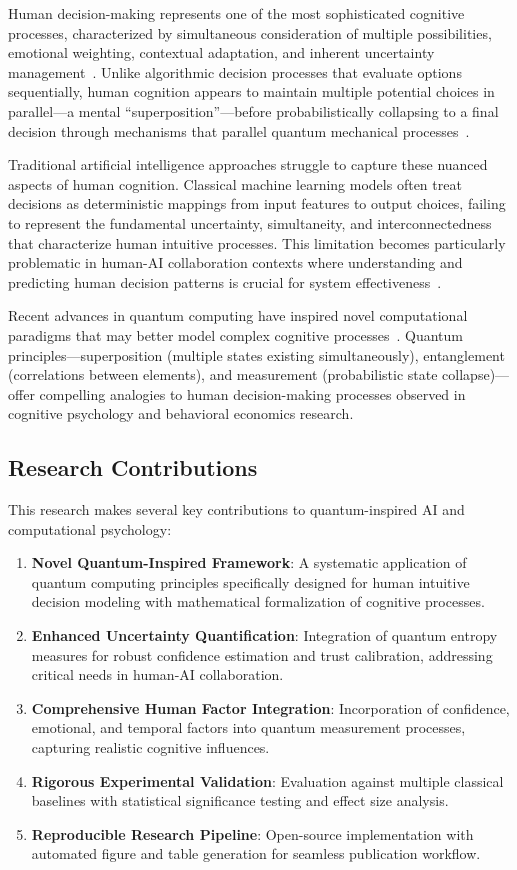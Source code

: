 \documentclass[conference]{IEEEtran}
\begin{document}
Human decision-making represents one of the most sophisticated cognitive processes, characterized by simultaneous consideration of multiple possibilities, emotional weighting, contextual adaptation, and inherent uncertainty management~\cite{kahneman2011thinking}. Unlike algorithmic decision processes that evaluate options sequentially, human cognition appears to maintain multiple potential choices in parallel—a mental ``superposition''—before probabilistically collapsing to a final decision through mechanisms that parallel quantum mechanical processes~\cite{busemeyer2012quantum}.

Traditional artificial intelligence approaches struggle to capture these nuanced aspects of human cognition. Classical machine learning models often treat decisions as deterministic mappings from input features to output choices, failing to represent the fundamental uncertainty, simultaneity, and interconnectedness that characterize human intuitive processes. This limitation becomes particularly problematic in human-AI collaboration contexts where understanding and predicting human decision patterns is crucial for system effectiveness~\cite{russell2019human}.

Recent advances in quantum computing have inspired novel computational paradigms that may better model complex cognitive processes~\cite{biamonte2017quantum}. Quantum principles—superposition (multiple states existing simultaneously), entanglement (correlations between elements), and measurement (probabilistic state collapse)—offer compelling analogies to human decision-making processes observed in cognitive psychology and behavioral economics research.

\subsection{Research Contributions}

This research makes several key contributions to quantum-inspired AI and computational psychology:
\begin{enumerate}
\item \textbf{Novel Quantum-Inspired Framework}: A systematic application of quantum computing principles specifically designed for human intuitive decision modeling with mathematical formalization of cognitive processes.
\item \textbf{Enhanced Uncertainty Quantification}: Integration of quantum entropy measures for robust confidence estimation and trust calibration, addressing critical needs in human-AI collaboration.
\item \textbf{Comprehensive Human Factor Integration}: Incorporation of confidence, emotional, and temporal factors into quantum measurement processes, capturing realistic cognitive influences.
\item \textbf{Rigorous Experimental Validation}: Evaluation against multiple classical baselines with statistical significance testing and effect size analysis.
\item \textbf{Reproducible Research Pipeline}: Open-source implementation with automated figure and table generation for seamless publication workflow.
\end{enumerate}
\end{document}
